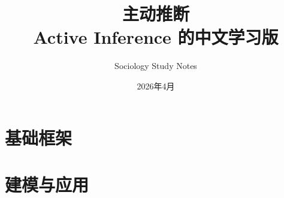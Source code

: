 

\title{\textbf{主动推断}\\[8pt]\large Active Inference 的中文学习版}
\author{Sociology Study Notes}
\date{2026年4月}



\frontmatter
\maketitle
\thispagestyle{empty}



\tableofcontents

\mainmatter
\part{基础框架}






\part{建模与应用}






\appendix




\backmatter

